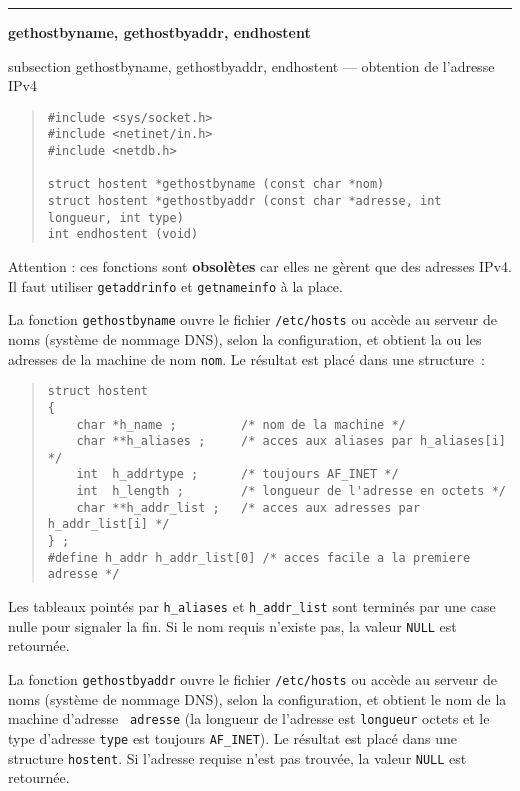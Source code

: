 \documentclass [twoside] {report}
\newcommand {\primitive} [1]
    {
	\phantomsection
	{\large \bf #1}
	\addcontentsline {toc} {subsection} {#1}
    }
\newcommand {\separation}
    {
	\vspace {5mm}
	\nopagebreak
	\hrule
    }
\begin{document}
\separation
\primitive {gethostbyname, gethostbyaddr,
endhostent} --- obtention de l'adresse IPv4

\begin {quote}
\begin {verbatim}
#include <sys/socket.h>
#include <netinet/in.h>
#include <netdb.h>

struct hostent *gethostbyname (const char *nom)
struct hostent *gethostbyaddr (const char *adresse, int longueur, int type)
int endhostent (void)
\end{verbatim}
\end {quote}

Attention : ces fonctions sont \textbf {obsolètes} car elles ne gèrent que
des adresses IPv4. Il faut utiliser \texttt {getaddrinfo} et \texttt
{getnameinfo} à la place.

La fonction {\tt gethostbyname} ouvre le fichier {\tt /etc/hosts}
ou accède au serveur de noms (système de nommage DNS), selon la
configuration, et obtient la ou les adresses de la machine de nom
{\tt nom}. Le résultat est placé dans une structure~:

\begin {quote}
    \small
\begin {verbatim}
struct hostent
{
    char *h_name ;         /* nom de la machine */
    char **h_aliases ;     /* acces aux aliases par h_aliases[i] */
    int  h_addrtype ;      /* toujours AF_INET */
    int  h_length ;        /* longueur de l'adresse en octets */
    char **h_addr_list ;   /* acces aux adresses par h_addr_list[i] */
} ;
#define h_addr h_addr_list[0] /* acces facile a la premiere adresse */
\end{verbatim}
\end {quote}

Les tableaux pointés par {\tt h\_aliases} et {\tt h\_addr\_list} sont
terminés par une case nulle pour signaler la fin. Si le nom requis
n'existe pas, la valeur {\tt NULL} est retournée.

La fonction {\tt gethostbyaddr} ouvre le fichier {\tt /etc/hosts} ou
accède au serveur de noms (système de nommage DNS), selon la
configuration, et obtient le nom de la machine d'adresse {\tt
adresse} (la longueur de l'adresse est {\tt longueur} octets et le
type d'adresse {\tt type} est toujours {\tt AF\_INET}). Le résultat
est placé dans une structure {\tt hostent}. Si l'adresse requise
n'est pas trouvée, la valeur {\tt NULL} est retournée.
\end{document}
